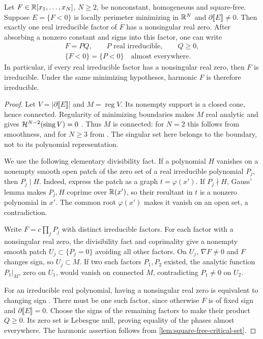 \begin{proposition}
\label{prop:minimizing-irreducibility}
Let \(F\in\mathbb R[x_1,\ldots,x_N]\), \(N\ge2\), be nonconstant,
homogeneous and square-free. Suppose \(E=\{F<0\}\) is locally
perimeter minimizing in \(\mathbb R^N\) and
\(\partial\llbracket E\rrbracket\ne0\).
Then exactly one real irreducible factor of \(F\) has a nonsingular
real zero. After absorbing a nonzero constant and signs into this
factor, one can write
\[
\begin{gathered}
 F=PQ,\qquad P\text{ real irreducible},\qquad Q\ge0,\\
 \{F<0\}=\{P<0\}\quad\text{almost everywhere}.
\end{gathered}
\]
In particular, if every real irreducible factor has a nonsingular
real zero, then \(F\) is irreducible. Under the same minimizing
hypotheses, harmonic \(F\) is therefore irreducible.
\end{proposition}

\begin{proof}
Let \(V=|\partial\llbracket E\rrbracket|\) and
\(M=\operatorname{reg}V\). Its nonempty support is a closed cone,
hence connected. Regularity of minimizing boundaries makes \(M\)
real analytic and gives \(\mathcal H^{N-2}(\operatorname{sing}V)=0\)
\cite[Part~III, introductory theorem, pp.~275--277]{Maggi12}.
Thus \(M\) is connected: for \(N=2\) this follows from smoothness,
and for \(N\ge3\) from
\cite[Section~5, proof of Theorem~1.1; Theorem~3.2]{WickramasekeraMaximum14}.
The singular set here belongs to the boundary, not to its polynomial
representation.

We use the following elementary divisibility fact. If a polynomial
\(H\) vanishes on a nonempty smooth open patch of the zero set of
a real irreducible polynomial \(P_j\), then \(P_j\mid H\).
Indeed, express the patch as a graph \(t=\varphi(x')\).
If \(P_j\nmid H\), Gauss' lemma
\cite[Chapter~VIII, Section~5]{Knapp16} makes \(P_j,H\) coprime over
\(\mathbb R(x')\), so their resultant in \(t\) is a nonzero polynomial
in \(x'\). The common root \(\varphi(x')\) makes it vanish on
an open set, a contradiction.

Write \(F=c\prod_jP_j\) with distinct irreducible factors.
For each factor with a nonsingular real zero, the divisibility fact
and coprimality give a nonempty smooth patch
\(U_j\subset\{P_j=0\}\) avoiding all other factors. On \(U_j\),
\(\nabla F\ne0\) and \(F\) changes sign, so \(U_j\subset M\).
If two such factors \(P_1,P_2\) existed, the analytic function
\(P_1|_M\), zero on \(U_1\), would vanish on connected \(M\),
contradicting \(P_1\ne0\) on \(U_2\).

For an irreducible real polynomial, having a nonsingular real zero
is equivalent to changing sign
\cite[Theorem~4.5.1]{BochnakCosteRoy98}. There must be one such
factor, since otherwise \(F\) is of fixed sign and
\(\partial\llbracket E\rrbracket=0\). Choose the signs of the
remaining factors to make their product \(Q\ge0\).
Its zero set is Lebesgue null, proving equality of the phases almost
everywhere. The harmonic assertion follows from
\cref{lem:square-free-critical-set}.
\end{proof}

